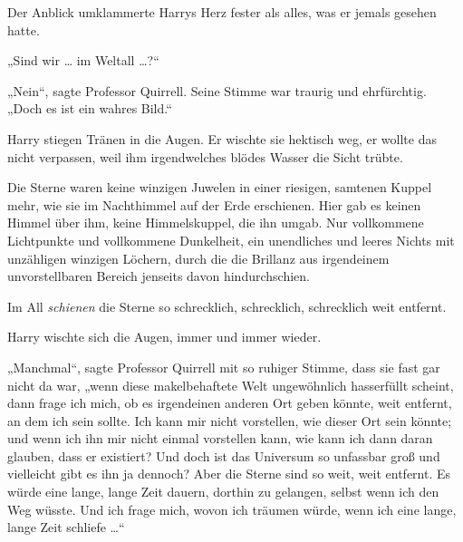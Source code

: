 Der Anblick umklammerte Harrys Herz fester als alles, was er jemals gesehen hatte.

„Sind wir … im Weltall …?“

„Nein“, sagte Professor Quirrell. Seine Stimme war traurig und ehrfürchtig.
„Doch es ist ein wahres Bild.“

Harry stiegen Tränen in die Augen. Er wischte sie hektisch weg, er wollte das nicht verpassen, weil ihm irgendwelches blödes Wasser die Sicht trübte.

Die Sterne waren keine winzigen Juwelen in einer riesigen, samtenen Kuppel mehr, wie sie im Nachthimmel auf der Erde erschienen. Hier gab es keinen Himmel über ihm, keine Himmelskuppel, die ihn umgab. Nur vollkommene Lichtpunkte und vollkommene Dunkelheit, ein unendliches und leeres Nichts mit unzähligen winzigen Löchern, durch die die Brillanz aus irgendeinem unvorstellbaren Bereich jenseits davon hindurchschien.

Im All \emph{schienen} die Sterne so schrecklich, schrecklich, schrecklich weit entfernt.

Harry wischte sich die Augen, immer und immer wieder.

„Manchmal“, sagte Professor Quirrell mit so ruhiger Stimme, dass sie fast gar nicht da war, „wenn diese makelbehaftete Welt ungewöhnlich hasserfüllt scheint, dann frage ich mich, ob es irgendeinen anderen Ort geben könnte, weit entfernt, an dem ich sein sollte. Ich kann mir nicht vorstellen, wie dieser Ort sein könnte; und wenn ich ihn mir nicht einmal vorstellen kann, wie kann ich dann daran glauben, dass er existiert? Und doch ist das Universum so unfassbar groß und vielleicht gibt es ihn ja dennoch? Aber die Sterne sind so weit, weit entfernt. Es würde eine lange, lange Zeit dauern, dorthin zu gelangen, selbst wenn ich den Weg wüsste. Und ich frage mich, wovon ich träumen würde, wenn ich eine lange, lange Zeit schliefe …“

